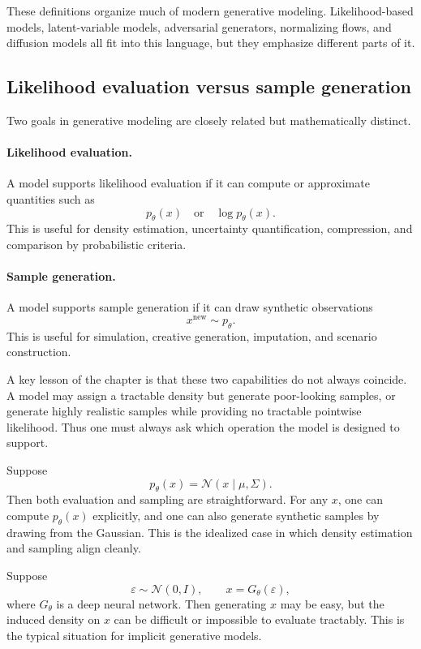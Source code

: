 These definitions organize much of modern generative modeling.
Likelihood-based models, latent-variable models, adversarial generators, normalizing flows, and diffusion models all fit into this language, but they emphasize different parts of it.

\subsection*{Likelihood evaluation versus sample generation}

Two goals in generative modeling are closely related but mathematically distinct.

\paragraph{Likelihood evaluation.}
A model supports likelihood evaluation if it can compute or approximate quantities such as
\[
p_\theta(x)
\quad \text{or} \quad
\log p_\theta(x).
\]
This is useful for density estimation, uncertainty quantification, compression, and comparison by probabilistic criteria.

\paragraph{Sample generation.}
A model supports sample generation if it can draw synthetic observations
\[
x^{\mathrm{new}} \sim p_\theta.
\]
This is useful for simulation, creative generation, imputation, and scenario construction.

\medskip

\noindent
A key lesson of the chapter is that these two capabilities do not always coincide.
A model may assign a tractable density but generate poor-looking samples, or generate highly realistic samples while providing no tractable pointwise likelihood.
Thus one must always ask which operation the model is designed to support.

\begin{example}
Suppose
\[
p_\theta(x)=\mathcal{N}(x\mid \mu,\Sigma).
\]
Then both evaluation and sampling are straightforward.
For any $x$, one can compute $p_\theta(x)$ explicitly, and one can also generate synthetic samples by drawing from the Gaussian.
This is the idealized case in which density estimation and sampling align cleanly.
\end{example}

\begin{example}
Suppose
\[
\varepsilon \sim \mathcal{N}(0,I),
\qquad
x = G_\theta(\varepsilon),
\]
where $G_\theta$ is a deep neural network.
Then generating $x$ may be easy, but the induced density on $x$ can be difficult or impossible to evaluate tractably.
This is the typical situation for implicit generative models.
\end{example}

